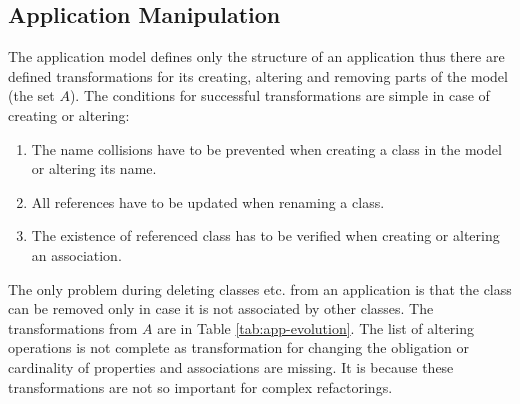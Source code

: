 \documentclass[runningheads]{comsis}
\begin{document}
\subsection{Application Manipulation}
\label{sec:app-evolution}
The application model defines only the structure of an application thus there are defined transformations for its creating, altering and removing parts of the model (the set $A$). The conditions for successful transformations are simple in case of creating or altering:
\begin{enumerate}
	\item The name collisions have to be prevented when creating a class in the model or altering its name.
	\item All references have to be updated when renaming a class.
	\item The existence of referenced class has to be verified when creating or altering an association.  
\end{enumerate}
The only problem during deleting classes etc. from an application is  that the class can be removed only in case it is not associated by other classes. The transformations from $A$ are in Table \ref{tab:app-evolution}. The list of altering operations is not complete as transformation for changing the obligation or cardinality of properties and associations are missing. It is because these transformations are not so important for complex refactorings. 
\end{document}
